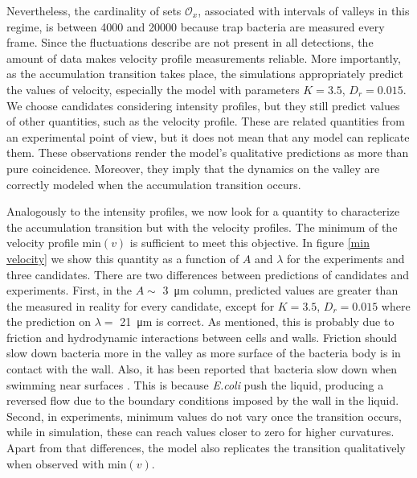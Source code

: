 Nevertheless, the cardinality of sets $\mathcal{O}_x$, associated with intervals of valleys in this regime, is between 4000 and 20000 because trap bacteria are measured every frame. Since the fluctuations describe are not present in all detections, the amount of data makes velocity profile measurements reliable. More importantly, as the accumulation transition takes place, the simulations appropriately predict the values of velocity, especially the model with parameters $K=3.5$, $D_r=0.015$. We choose candidates considering intensity profiles, but they still predict values of other quantities, such as the velocity profile. These are related quantities from an experimental point of view, but it does not mean that any model can replicate them. These observations render the model's qualitative predictions as more than pure coincidence. Moreover, they imply that the dynamics on the valley are correctly modeled when the accumulation transition occurs.



Analogously to the intensity profiles, we now look for a quantity to characterize the accumulation transition but with the velocity profiles. The minimum of the velocity profile $\text{min}(v)$ is sufficient to meet this objective. In figure \ref{min velocity} we show this quantity as a function of $A$ and $\lambda$ for the experiments and three candidates. There are two differences between predictions of candidates and experiments. First, in the $A\sim$ \SI{3}{\micro\meter} column, predicted values are greater than the measured in reality for every candidate, except for $K=3.5$, $D_r=0.015$ where the prediction on $\lambda=$ \SI{21}{\micro\meter} is correct. As mentioned, this is probably due to friction and hydrodynamic interactions between cells and walls. Friction should slow down bacteria more in the valley as more surface of the bacteria body is in contact with the wall. Also, it has been reported that bacteria slow down when swimming near surfaces \cite{Bianchi2017HolographicBacteria}. This is because \textit{E.coli} push the liquid, producing a reversed flow due to the boundary conditions imposed by the wall in the liquid. Second, in experiments, minimum values do not vary once the transition occurs, while in simulation, these can reach values closer to zero for higher curvatures. Apart from that differences, the model also replicates the transition qualitatively when observed with $\text{min}(v)$.

